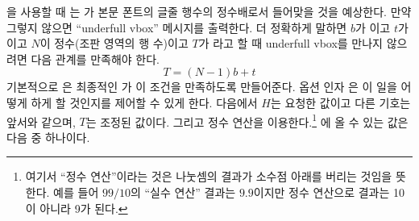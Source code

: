 \cmd{\flushbottom}을 사용할 때 \ltx 는 \lnc{\textheight}가 
본문 폰트의 글줄 행수의 정수배로서 들어맞을 것을 예상한다.
만약 그렇지 않으면 “underfull vbox” 메시지를 출력한다.
더 정확하게 말하면 $b$가 \lnc{\baselineskip}이고 $t$가 \lnc{\topskip}이고
$N$이 정수(조판 영역의 행 수)이고 $T$가 \lnc{\textheight}라고 할 때
underfull vbox를 만나지 않으려면 다음 관계를 만족해야 한다.
\begin{equation}
T = (N-1)b + t \label{eq:heightlines}
\end{equation}
기본적으로 \cmd{\checkthelayout}은 최종적인 \lnc{\textheight}가
이 조건을 만족하도록 만들어준다. 옵션 인자 은
이 일을 어떻게 하게 할 것인지를 제어할 수 있게 한다.
다음에서 $H$는 요청한 \lnc{\textheight} 값이고 다른 기호는 앞서와 같으며,
$T$는 조정된 값이다. 그리고 정수 연산을 이용한다.\footnote{여기서 “정수 연산”이라는 것은 나눗셈의 결과가 소수점 아래를 버리는 것임을 뜻한다. 예를 들어 $99/10$의
“실수 연산” 결과는 $9.9$이지만 정수 연산으로 결과는 10이 아니라 9가 된다.}
에 올 수 있는 값은 다음 중 하나이다.
